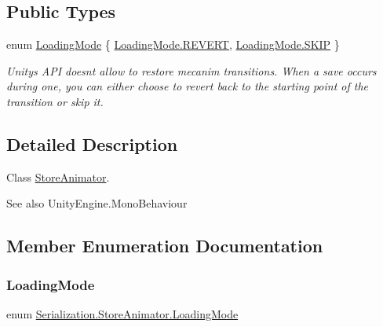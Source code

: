 \subsection*{Public Types}
\begin{DoxyCompactItemize}
\item 
enum \hyperlink{class_serialization_1_1_store_animator_aa46e56354c0ab12cff62084f47a71c0e}{Loading\+Mode} \{ \hyperlink{class_serialization_1_1_store_animator_aa46e56354c0ab12cff62084f47a71c0eab2ba499cdcc5bd215190b572b4b09042}{Loading\+Mode.\+R\+E\+V\+E\+RT}, 
\hyperlink{class_serialization_1_1_store_animator_aa46e56354c0ab12cff62084f47a71c0eab85df04e922fe1dd3c1f0692faeaacef}{Loading\+Mode.\+S\+K\+IP}
 \}\begin{DoxyCompactList}\small\item\em Unity\textquotesingle{}s A\+PI doesn\textquotesingle{}t allow to restore mecanim transitions. When a save occurs during one, you can either choose to revert back to the starting point of the transition or skip it. \end{DoxyCompactList}
\end{DoxyCompactItemize}


\subsection{Detailed Description}
Class \hyperlink{class_serialization_1_1_store_animator}{Store\+Animator}. 

\begin{DoxySeeAlso}{See also}
Unity\+Engine.\+Mono\+Behaviour


\end{DoxySeeAlso}


\subsection{Member Enumeration Documentation}
\mbox{\label{class_serialization_1_1_store_animator_aa46e56354c0ab12cff62084f47a71c0e}} 
\subsubsection{\texorpdfstring{Loading\+Mode}{LoadingMode}}
{\footnotesize\ttfamily enum \hyperlink{class_serialization_1_1_store_animator_aa46e56354c0ab12cff62084f47a71c0e}{Serialization.\+Store\+Animator.\+Loading\+Mode}\hspace{0.3cm}{\ttfamily [strong]}}



